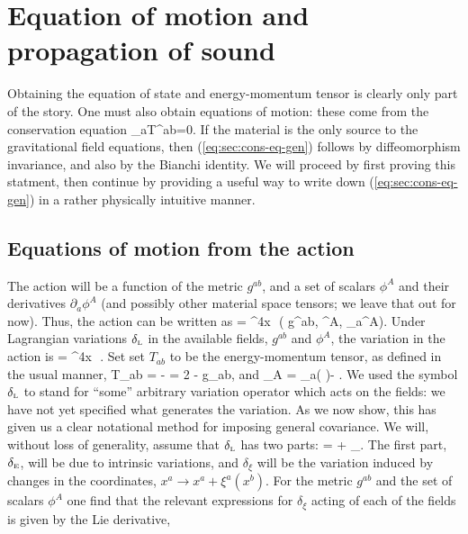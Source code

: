 \cleardoublepage
\section{Equation of motion and propagation of sound}
Obtaining the equation of state and energy-momentum tensor is clearly only part of the story. One must also obtain equations of motion: these come from the conservation equation
\bea
\label{eq:sec:cons-eq-gen}
\nabla_aT^{ab}=0.
\eea
If the material is the only source to the gravitational field equations, then (\ref{eq:sec:cons-eq-gen}) follows by diffeomorphism invariance, and also by the Bianchi identity. We will proceed by first proving this statment, then continue by providing a useful way to write down  (\ref{eq:sec:cons-eq-gen}) in a rather physically intuitive manner.

\subsection{Equations of motion from the action}
The   action will be a function of the metric $g^{ab}$, and a set of scalars $\phi^A$ and their derivatives $  \partial_a\phi^A$ (and possibly other material space tensors; we leave that out for now). Thus, the action can be written as
\bea
{} = \int \dd^4x\,\, \rho\left( g^{ab}, \phi^A, \partial_a\phi^A\right).
\eea
Under Lagrangian variations ${ {\delta}_{\scriptscriptstyle{\rm{L}}}}$ in the available fields, $g^{ab}$ and $\phi^A$, the variation in the action is
\bea
\lp {}  = \int \dd^4x\,\, .
\eea
Set set $T_{ab}$ to be the energy-momentum tensor, as defined in the usual manner, 
\bea
T_{ab} = -  = 2 - \rho g_{ab},
\eea
and
\bea
{}_A = \nabla_a\left( \right)-  .
\eea
We used the symbol ${ {\delta}_{\scriptscriptstyle{\rm{L}}}}$ to   stand for ``some'' arbitrary variation operator which acts on the fields: we have not yet specified what generates the variation. As we now show, this has given us a clear notational method for imposing general covariance. We will, without loss of generality, assume that ${ {\delta}_{\scriptscriptstyle{\rm{L}}}}$ has two parts:
\bea
\lp = \ep + \delta_{\xi}.
\eea
The first part, ${ {\delta}_{\scriptscriptstyle{\rm{E}}}}$, will be due to intrinsic variations, and $\delta_{\xi}$ will be the variation induced by changes in the coordinates, $x^a\rightarrow x^a + \xi^a(x^b)$. For the metric $g^{ab}$ and the set of scalars $\phi^A$ one find that the relevant expressions for $\delta_{\xi}$ acting of each of the fields is given by the Lie derivative,
